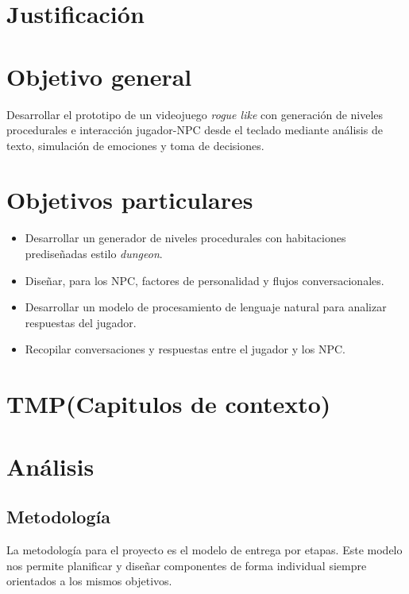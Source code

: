 \documentclass[12pt,twoside]{article}
\begin{document}
	\clearpage
	\section{Justificación}
	
	
	
	\clearpage
	\section{Objetivo general}
	Desarrollar el prototipo de un videojuego \textit{rogue like} con generación de niveles procedurales e interacción jugador-NPC desde el teclado mediante análisis de texto, simulación de emociones y toma de decisiones.
	
	\section{Objetivos particulares}
	
	\begin{itemize}
		\item Desarrollar un generador de niveles procedurales con habitaciones prediseñadas estilo \textit{dungeon}.
		\item Diseñar, para los NPC, factores de personalidad y flujos conversacionales.
		\item Desarrollar  un modelo  de procesamiento de lenguaje natural para analizar respuestas del jugador.
		\item Recopilar conversaciones y respuestas entre el jugador y los NPC.
	\end{itemize}
	
	\clearpage
	\section{TMP(Capitulos de contexto)}
	
	\clearpage
	\section{Análisis}
	
	\subsection{Metodología}

	La metodología para el proyecto es el modelo de entrega por etapas. Este modelo nos permite planificar y diseñar componentes de forma individual siempre orientados a los mismos objetivos.
\end{document}
